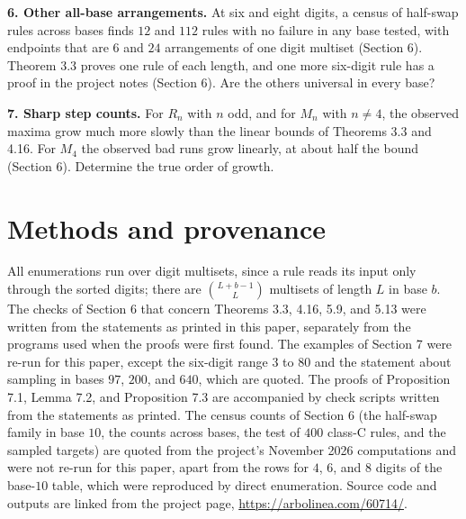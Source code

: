 \documentclass[11pt,letterpaper]{article}
\theoremstyle{paperstyle}
\theoremstyle{paperstyledef}
\theoremstyle{paperstylerem}
\begin{document}
\textbf{6. Other all-base arrangements.} At six and eight digits, a census of half-swap rules across bases finds \(12\) and \(112\) rules with no failure in any base tested, with endpoints that are \(6\) and \(24\) arrangements of one digit multiset (Section 6). Theorem 3.3 proves one rule of each length, and one more six-digit rule has a proof in the project notes (Section 6). Are the others universal in every base?

\textbf{7. Sharp step counts.} For \(R_n\) with \(n\) odd, and for \(M_n\) with \(n \neq 4\), the observed maxima grow much more slowly than the linear bounds of Theorems 3.3 and 4.16. For \(M_4\) the observed bad runs grow linearly, at about half the bound (Section 6). Determine the true order of growth.

\section{Methods and provenance}\label{methods-and-provenance}

All enumerations run over digit multisets, since a rule reads its input only through the sorted digits; there are \(\binom{L+b-1}{L}\) multisets of length \(L\) in base \(b\). The checks of Section 6 that concern Theorems 3.3, 4.16, 5.9, and 5.13 were written from the statements as printed in this paper, separately from the programs used when the proofs were first found. The examples of Section 7 were re-run for this paper, except the six-digit range \(3\) to \(80\) and the statement about sampling in bases \(97\), \(200\), and \(640\), which are quoted. The proofs of Proposition 7.1, Lemma 7.2, and Proposition 7.3 are accompanied by check scripts written from the statements as printed. The census counts of Section 6 (the half-swap family in base \(10\), the counts across bases, the test of \(400\) class-C rules, and the sampled targets) are quoted from the project's November 2026 computations and were not re-run for this paper, apart from the rows for \(4\), \(6\), and \(8\) digits of the base-\(10\) table, which were reproduced by direct enumeration. Source code and outputs are linked from the project page, \url{https://arbolinea.com/60714/}.
\end{document}
